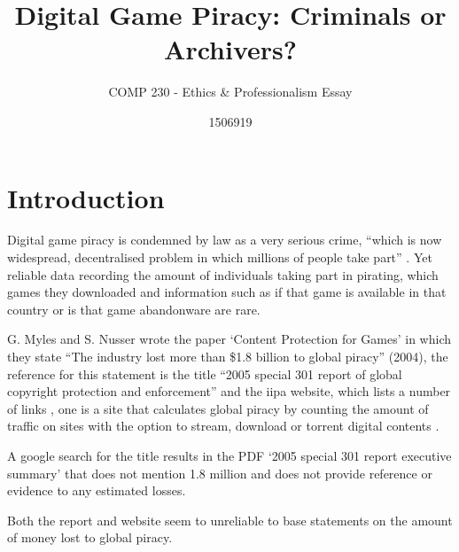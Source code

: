 \documentclass{scrartcl}
\title{Digital Game Piracy: Criminals or Archivers?}
\subtitle{COMP 230 - Ethics \& Professionalism Essay}
\author{1506919}
\begin{document}
\maketitle


\section*{Introduction}

Digital game piracy is condemned by law as a very serious crime, ``which is now widespread, decentralised problem in which millions of people take part'' \cite{myles2006content}. Yet reliable data recording the amount of individuals taking part in pirating, which games they downloaded and information such as if that game is available in that country or is that game abandonware are rare.

G. Myles and S. Nusser wrote the paper `Content Protection for Games' \cite{myles2006content} in which they state ``The industry lost more than \$1.8 billion to global piracy'' (2004), the reference for this statement is the title ``2005 special 301 report of global copyright protection and enforcement'' and the iipa website, which lists a number of links \cite{iipa}, one is a site that calculates global piracy by counting the amount of traffic on sites with the option to stream, download or torrent digital contents \cite{muso}.

A google search for the title results in the PDF `2005 special 301 report executive summary' \cite{301report} that does not mention 1.8 million and does not provide reference or evidence to any estimated losses.

Both the report and website seem to unreliable to base statements on the amount of money lost to global piracy.
\end{document}
